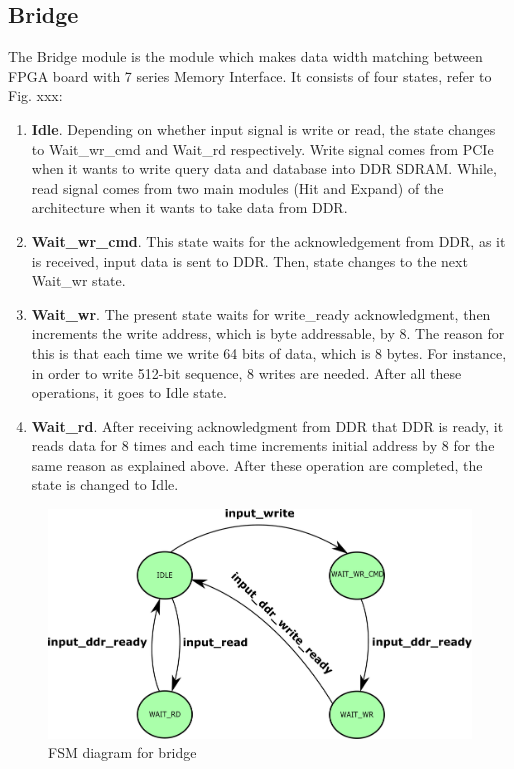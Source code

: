 \subsection{Bridge}
\quad The Bridge module is the module which makes data width matching between FPGA board with 7 series Memory Interface. It consists of four states, refer to Fig. xxx:
\begin{enumerate}
\item \textbf{Idle}. Depending on whether input signal is write or read, the state changes to Wait\_wr\_cmd and Wait\_rd respectively. Write signal comes from PCIe when it wants to write query data and database into DDR SDRAM. While, read signal comes from two main modules (Hit and Expand) of the architecture when it wants to take data from DDR.
\item \textbf{Wait\_wr\_cmd}. This state waits for the acknowledgement from DDR, as it is received, input data is sent to DDR. Then, state changes to the next Wait\_wr state.
\item \textbf{Wait\_wr}. The present state waits for write\_ready acknowledgment, then increments the write address, which is byte addressable, by 8. The reason for this is that each time we write 64 bits of data, which is 8 bytes. For instance, in order to write 512-bit sequence, 8 writes are needed. After all these operations, it goes to Idle state.
\item \textbf{Wait\_rd}. After receiving acknowledgment from DDR that DDR is ready, it reads data for 8 times and each time increments initial address by 8 for the same reason as explained above. After these operation are completed, the state is changed to Idle. 
\end{enumerate}


\begin{figure}
\centering
\includegraphics[width=\columnwidth]{Figures/bridgeFSM.pdf}
\caption{FSM diagram for bridge} \label{fig:bridge}
\end{figure}
